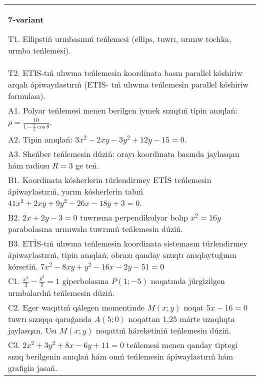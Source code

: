 \documentclass{article}
\begin{document}
\begin{tabular}{m{17cm}}
\textbf{7-variant}
\newline

T1. Ellipstiń urınbasınıń teńlemesi (ellips, tuwrı, urınıw tochka, urınba teńlemesi).\\

T2. ETIS-tıń ulıwma teńlemesin koordinata basın parallel kóshiriw arqalı ápiwayılastırıń (ETIS- tıń ulıwma teńlemesin parallel kóshiriw formulası).\\

A1. Polyar teńlemesi menen berilgen iymek sızıqtıń tipin anıqlań: $\rho=\frac{10}{1-\frac{3}{2}\cos\theta}$.\\

A2. Tipin anıqlań: $3 x^{2}-2 xy-3 y^{2}+12 y-15=0$.\\

A3. Sheńber teńlemesin dúziń: orayı koordinata basında jaylasqan hám radiusı $R=3$ ge teń.\\

B1. Koordinata kósherlerin túrlendirmey ETİS teńlemesin ápiwaylastırıń, yarım kósherlerin tabıń $41x^{2} + 2xy + 9y^{2} - 26x - 18y + 3 = 0$.  \\

B2. $2x + 2y - 3 = 0$ tuwrısına perpendikulyar bolıp $x^{2} = 16y$ parabolasına urınıwshı tuwrınıń teńlemesin dúziń.  \\

B3. ETİS-tıń ulıwma teńlemesin koordinata sistemasın túrlendirmey ápiwaylastırıń, tipin anıqlań, obrazı qanday sızıqtı anıqlaytuǵının kórsetiń. $7x^{2} - 8xy + y^{2} - 16x - 2y - 51 = 0$  \\

C1. $\frac{x^{2}}{3} - \frac{y^{2}}{5} = 1$ giperbolasına $P(1; - 5)$ noqatında júrgizilgen urınbalardıń teńlemesin dúziń.\\

C2. Eger waqıttıń qálegen momentinde $M(x;y)$ noqat $5x - 16 = 0$ tuwrı sızıqqa qaraǵanda $A(5;0)$ noqattan 1,25 márte uzaqlıqta jaylasqan. Usı $M(x;y)$ noqattıń háreketiniń teńlemesin dúziń.  \\

C3. $2x^{2} + 3y^{2} + 8x - 6y + 11 = 0$ teńlemesi menen qanday tiptegi sızıq berilgenin anıqlań hám onıń teńlemesin ápiwaylastırıń hám grafigin jasań.  \\

\end{tabular}
\vspace{1cm}
\end{document}

